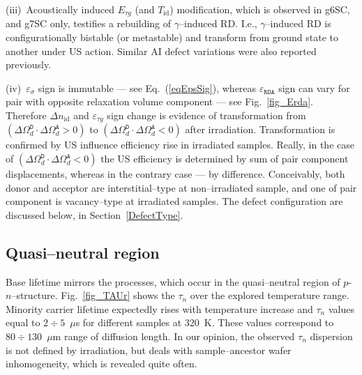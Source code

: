 \documentclass[aip,jap, amsmath,amssymb,reprint]{revtex4-1}
\begin{document}
\noindent
(iii)~Acoustically induced $E_{\tau g}$ (and $T_{\mathrm{id}}$) modification, which is observed in g6SC, and g7SC only,
testifies a rebuilding of  $\gamma$--induced RD.
I.e., $\gamma$--induced RD is conﬁgurationally bistable (or metastable) and transform from ground state to another under US action.
Similar AI defect variations were also reported previously.\cite{Wosinski,Ostapenko1994,Olikh2009Sem,YOlikhTPL2011}

\noindent
(iv)~$\varepsilon_{\sigma}$ sign is immutable --- see Eq.~(\ref{eqEpsSig}),
whereas $\varepsilon_{\mathtt{RDA}}$ sign can vary for pair with opposite relaxation volume component --- see Fig.~\ref{fig_Erda}.
Therefore $\Delta n_{\mathrm{id}}$ and $\varepsilon_{\tau g}$ sign change is evidence of transformation
from $(\Delta\Omega_d^\mathtt{D}\cdot\Delta\Omega_d^\mathtt{A}>0)$  to
$(\Delta\Omega_d^\mathtt{D}\cdot\Delta\Omega_d^\mathtt{A}<0)$  after irradiation.
Transformation is confirmed by US influence efficiency rise in irradiated samples.
Really, in the case of $(\Delta\Omega_d^\mathtt{D}\cdot\Delta\Omega_d^\mathtt{A}<0)$ the US efficiency is determined by sum of pair component displacements,
whereas in the contrary case  --- by difference.
Conceivably, both donor and acceptor are interstitial--type at non--irradiated sample, and one of pair component is vacancy--type at irradiated samples.
The defect configuration are discussed below, in Section~\ref{DefectType}.


\subsection{Quasi--neutral region\label{Base}}

Base lifetime mirrors the processes, which occur in the quasi--neutral region  of $p$-$n$--structure.
Fig.~\ref{fig_TAUr} shows the  $\tau_n$  over the explored temperature range.
Minority carrier lifetime expectedly rises with temperature increase and
$\tau_n$ values equal to $2\div5$~$\mu$s for different samples at 320~K.
These values correspond to $80\div130$~$\mu$m range of diffusion length.
In our opinion, the observed $\tau_n$ dispersion is not defined by irradiation, but deals with sample--ancestor wafer inhomogeneity, which is revealed
quite often.\cite{Oxide:Chen,Oxide_Schon}
\end{document}
